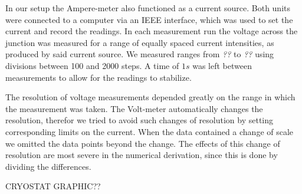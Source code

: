 In our setup the Ampere-meter also functioned as a current source. Both units were connected to a computer via an IEEE interface, which was used to set the current and record the readings. In each measurement run the voltage across the junction was measured for a range of equally spaced current intensities, as produced by said current source.  We measured ranges from \emph{??} to  \emph{??} using divisions between 100 and 2000 steps. A time of $1s$ was left between measurements to allow for the readings to stabilize.

The resolution of voltage measurements depended greatly on the range in which the measurement was taken. The Volt-meter automatically changes the resolution, therefor we tried to avoid such changes of resolution by setting corresponding limits on the current. When the data contained a change of scale we omitted the data points beyond the change. The effects of this change of resolution are most severe in the numerical derivation, since this is done by dividing the differences.

CRYOSTAT GRAPHIC??\\







